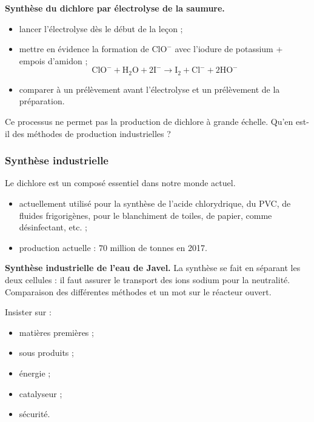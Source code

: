 \begin{experience}
\textbf{Synthèse du dichlore par électrolyse de la saumure.}
\begin{itemize}
\item lancer l'électrolyse dès le début de la leçon ;
\item mettre en évidence la formation de $\mathrm{ClO^-}$ avec l'iodure de potassium + empois d'amidon ;
\begin{equation*}
\mathrm{ClO^- + H_2O + 2I^- \rightarrow I_2 + Cl^- + 2HO^-} 
\end{equation*}
\item comparer à un prélèvement avant l'électrolyse et un prélèvement de la préparation.
\end{itemize}
\end{experience}

\begin{transition}
Ce processus ne permet pas la production de dichlore à grande échelle.
Qu'en est-il des méthodes de production industrielles ?
\end{transition}

\subsubsection{Synthèse industrielle}

Le dichlore est un composé essentiel dans notre monde actuel.
\begin{itemize}
\item actuellement utilisé pour la synthèse de l'acide chlorydrique, du PVC, de fluides frigorigènes, pour le blanchiment de toiles, de papier, comme désinfectant, etc. ;
\item production actuelle : $70$ million de tonnes en 2017.
\end{itemize}

\begin{slide}
\textbf{Synthèse industrielle de l'eau de Javel.}
La synthèse se fait en séparant les deux cellules : il faut assurer le transport des ions sodium pour la neutralité.
Comparaison des différentes méthodes et un mot sur le réacteur ouvert.
\end{slide}

Insister sur :
\begin{itemize}
\item matières premières ;
\item sous produits ;
\item énergie ;
\item catalyseur ;
\item sécurité.
\end{itemize}

